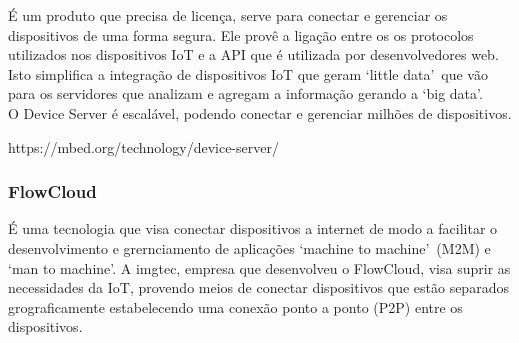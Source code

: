 É um produto que precisa de licença, serve para conectar e gerenciar os dispositivos de uma forma segura. Ele provê a ligação entre os os protocolos utilizados nos dispositivos IoT e a API que é utilizada por desenvolvedores web. Isto simplifica a integração de dispositivos IoT que geram \lq little data\rq\ que vão para os servidores que analizam e agregam a informação gerando a \lq big data\rq.\\
O Device Server é escalável, podendo conectar e gerenciar milhões de dispositivos.

https://mbed.org/technology/device-server/ \\

\subsubsection{FlowCloud}
É uma tecnologia que visa conectar dispositivos a internet de modo a facilitar o desenvolvimento e grernciamento de aplicações \lq machine to machine\rq\ (M2M) e \lq man to machine\rq. A imgtec, empresa que desenvolveu o FlowCloud, visa suprir as necessidades da IoT, provendo meios de conectar dispositivos que estão separados grograficamente estabelecendo uma conexão ponto a ponto (P2P) entre os dispositivos.
